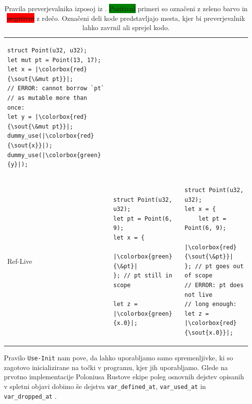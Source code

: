 \documentclass[a4paper,12pt,openright]{book}
\newcommand{\goodexample}[1]{\colorbox{green}{#1}}
\newcommand{\badexample}[1]{\colorbox{red}{\sout{#1}}}
\begin{document}
{\begin{table}[!htbp]
\begin{tabular}{p{} p{} p{}}
		\begin{minipage}[t]{0.41\textwidth}
			\begin{verbatim}
struct Point(u32, u32);
let mut pt = Point(13, 17);
let x = |\badexample{\&mut pt}|;
// ERROR: cannot borrow `pt`
// as mutable more than once:
let y = |\badexample{\&mut pt}|;
dummy_use(|\badexample{x}|);
dummy_use(|\goodexample{y}|);
\end{verbatim}
		\end{minipage}                                                  \\
		Ref-Live                                                    &                                     %
		\begin{minipage}[t]{0.41\textwidth}
			\begin{verbatim}
struct Point(u32, u32);
let pt = Point(6, 9);
let x = {
    |\goodexample{\&pt}|
}; // pt still in scope

let z = |\goodexample{x.0}|;
\end{verbatim}
		\end{minipage}           &                                                  %
		\begin{minipage}[t]{0.41\textwidth}
			\begin{verbatim}
struct Point(u32, u32);
let x = {
    let pt = Point(6, 9);
    |\badexample{\&pt}|
}; // pt goes out of scope
// ERROR: pt does not live
// long enough:
let z = |\badexample{x.0}|;
\end{verbatim}
		\end{minipage}
	\end{tabular}
	\caption[The Rules of the Borrow Check]{
		Pravila preverjevalnika izposoj iz \cite{stjernaModellingRustsReference}. \goodexample{Pozitivni}
		primeri so označeni z zeleno barvo in \badexample{negativni} z rdečo. Označeni deli kode predstavljajo mesta,
		kjer bi preverjevalnik lahko zavrnil ali sprejel kodo.
	}\label{tab:borrow-check}
\end{table}%
}

Pravilo \verb|Use-Init| nam pove, da lahko uporabljamo samo spremenljivke, ki so zagotovo inicializirane
na točki v programu, kjer jih uporabljamo. Glede na prvotno implementacije Poloniusa Rustove ekipe poleg
osnovnih dejstev opisanih v spletni objavi dobimo še dejstva \verb|var_defined_at|, \verb|var_used_at| in
\verb|var_dropped_at| \cite{RustlangPoloniusDefines}.
\end{document}
